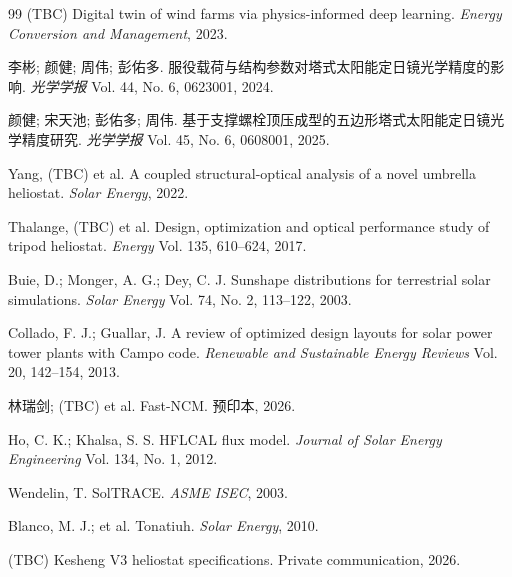 \documentclass[12pt,a4paper]{ctexart}
\begin{document}
\begin{thebibliography}{99}
(TBC) Digital twin of wind farms via physics-informed deep learning.
\textit{Energy Conversion and Management}, 2023.

李彬; 颜健; 周伟; 彭佑多.
服役载荷与结构参数对塔式太阳能定日镜光学精度的影响.
\textit{光学学报} Vol. 44, No. 6, 0623001, 2024.

颜健; 宋天池; 彭佑多; 周伟.
基于支撑螺栓顶压成型的五边形塔式太阳能定日镜光学精度研究.
\textit{光学学报} Vol. 45, No. 6, 0608001, 2025.

Yang, (TBC) et al. A coupled structural-optical analysis of a novel umbrella heliostat.
\textit{Solar Energy}, 2022.

Thalange, (TBC) et al. Design, optimization and optical performance study of tripod heliostat.
\textit{Energy} Vol. 135, 610--624, 2017.

Buie, D.; Monger, A. G.; Dey, C. J.
Sunshape distributions for terrestrial solar simulations.
\textit{Solar Energy} Vol. 74, No. 2, 113--122, 2003.

Collado, F. J.; Guallar, J.
A review of optimized design layouts for solar power tower plants with Campo code.
\textit{Renewable and Sustainable Energy Reviews} Vol. 20, 142--154, 2013.

林瑞剑; (TBC) et al. Fast-NCM. 预印本, 2026.

Ho, C. K.; Khalsa, S. S. HFLCAL flux model.
\textit{Journal of Solar Energy Engineering} Vol. 134, No. 1, 2012.

Wendelin, T. SolTRACE. \textit{ASME ISEC}, 2003.

Blanco, M. J.; et al. Tonatiuh. \textit{Solar Energy}, 2010.

(TBC) Kesheng V3 heliostat specifications. Private communication, 2026.

\end{thebibliography}
\end{document}
